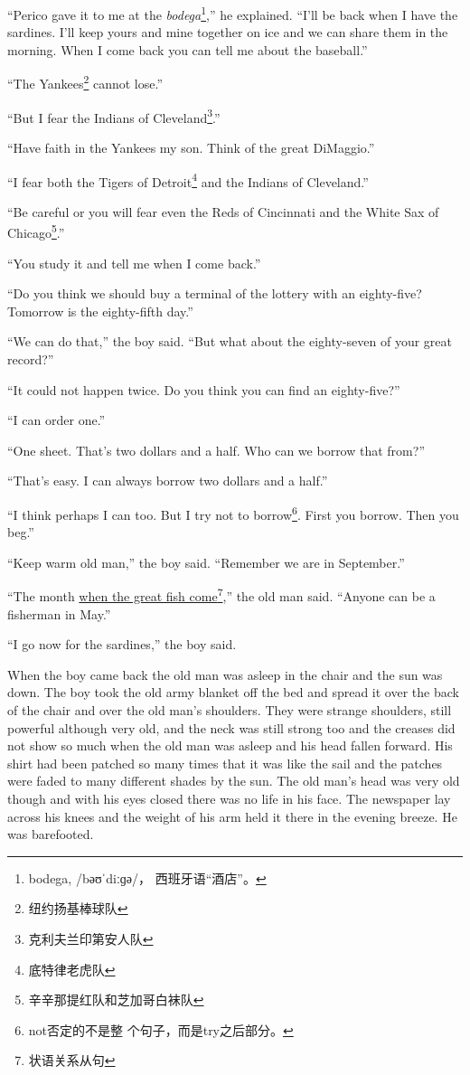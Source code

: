 \documentclass[fontset=ubuntu,zihao=-4]{ctexrep}
\newcommand\doulos[1]{{\fontspec{Doulos SIL} /#1/}}
\begin{document}
``Perico gave it to me at the \emph{bodega}\footnote{bodega, \doulos{bәʊˈdiːɡә}，
  西班牙语“酒店”。},'' he explained. ``I'll be back when I have the
sardines. I'll keep yours and mine together on ice and we can share them in
the morning. When I come back you can tell me about the baseball.''

``The Yankees\footnote{纽约扬基棒球队} cannot lose.''

``But I fear the Indians of Cleveland\footnote{克利夫兰印第安人队}.''

``Have faith in the Yankees my son. Think of the great DiMaggio.''

``I fear both the Tigers of Detroit\footnote{底特律老虎队} and the Indians of Cleveland.''

``Be careful or you will fear even the Reds of Cincinnati and the White Sax of Chicago\footnote{辛辛那提红队和芝加哥白袜队}.''

``You study it and tell me when I come back.''

``Do you think we should buy a \gls{terminal} of the lottery with an eighty-five?
Tomorrow is the eighty-fifth day.''

``We can do that,'' the boy said. ``But what about the eighty-seven of your great record?''

``It could not happen twice. Do you think you can find an eighty-five?''

``I can \gls{order} one.''

``One sheet. That's two dollars and a half. Who can we borrow that from?''

``That's easy. I can always borrow two dollars and a half.''

``I think perhaps I can too. But I try not to borrow\footnote{not否定的不是整
  个句子，而是try之后部分。}. First you borrow. Then you beg.''

``Keep warm old man,'' the boy said. ``Remember we are in September.''

``The month \uline{when the great fish come}\footnote{状语关系从句},'' the old
man said. ``Anyone can be a fisherman in May.''

``I go now for the sardines,'' the boy said.

When the boy came back the old man was \gls{asleep} in the chair and the sun was
down. The boy took the old army \gls{blanket} off the bed and \gls{spread}
it over the back of the chair and over the old man's shoulders. They were
strange shoulders, still powerful although very old, and the neck was still
strong too and the \glspl{crease} did not show so much when the old man was
asleep and his head fallen forward. His shirt had been \gls{patched} so many
times that it was like the sail and the patches were \gls{faded} to many
different \glspl{shade} by the sun. The old man's head was very old though
and with his eyes closed there was no life in his face. The newspaper
\gls{lay} across his \glspl{knee} and the weight of his arm held it there in
the evening breeze. He was \gls{barefooted}.
\end{document}
